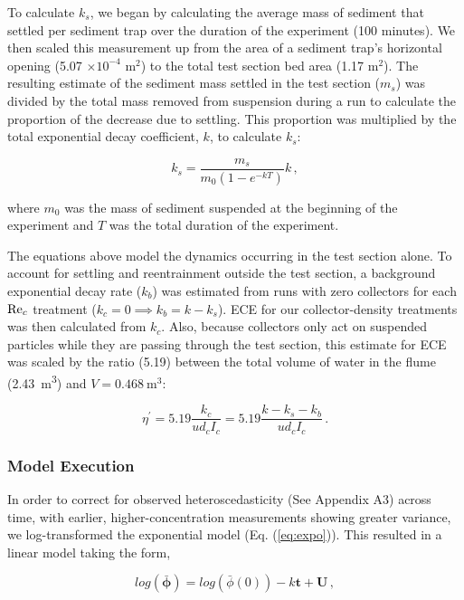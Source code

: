 \documentclass[geosciences,article,submit,moreauthors,pdftex]{Definitions/mdpi}
\begin{document}
To calculate $k_s$, we began by calculating the average mass of sediment that settled per sediment trap over the duration of the experiment (100 minutes). We then scaled this measurement up from the area of a sediment trap's horizontal opening (5.07 $\times 10^{-4}$ m$^2$) to the total test section bed area (1.17 m$^2$). The resulting estimate of the sediment mass settled in the test section ($m_s$) was divided by the total mass removed from suspension during a run to calculate the proportion of the decrease due to settling. This proportion was multiplied by the total exponential decay coefficient, $k$, to calculate $k_s$:

\begin{equation}
    k_s = \frac{m_s}{m_0(1-e^{-kT})}k\,,
    \label{eq:ks}
\end{equation}

\noindent where $m_0$ was the mass of sediment suspended at the beginning of the experiment and $T$ was the total duration of the experiment.

The equations above model the dynamics occurring in the test section alone. To account for settling and reentrainment outside the test section, a background exponential decay rate ($k_b$) was estimated from runs with zero collectors for each $\mathrm{Re}_c$ treatment ($k_c = 0 \implies k_b = k - k_s$). ECE for our collector-density treatments was then calculated from $k_c$. Also, because collectors only act on suspended particles while they are passing through the test section, this estimate for ECE was scaled by the ratio (5.19) between the total volume of water in the flume (\SI{2.43}{\metre\cubed}) and $V = \SI{0.468}{\metre\cubed}$:

\begin{equation}
    \eta^\prime = 5.19\frac{k_c}{ud_cI_c} = 5.19\frac{k - k_s - k_b}{ud_cI_c}\,.
    \label{eq:eta}
\end{equation}

\subsubsection{Model Execution}

In order to correct for observed heteroscedasticity (See Appendix A3) across time, with earlier, higher-concentration measurements showing greater variance, we log-transformed the exponential model (Eq. (\ref{eq:expo})). This resulted in a linear model taking the form,

\begin{equation}
    log(\boldsymbol{\bar{\phi}}) = log(\bar{\phi}(0)) - k\boldsymbol{t} + \boldsymbol{U} \,,
\end{equation}
\end{document}
